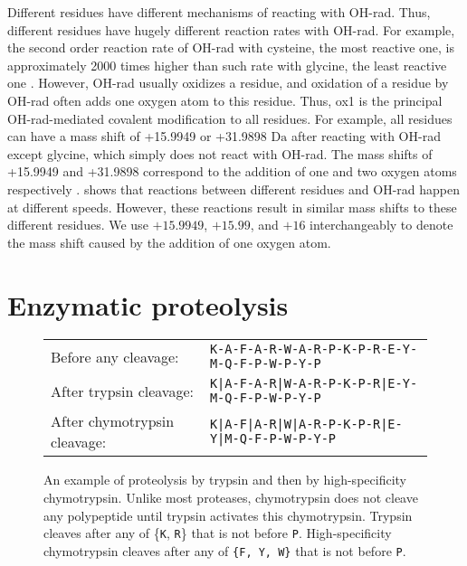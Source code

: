Different residues have different mechanisms of reacting with \gls{OH-rad}. 
Thus, different residues have hugely different reaction rates with \gls{OH-rad}.
For example,	the second order reaction rate of \gls{OH-rad} with cysteine, the most reactive one, 
 is approximately 2000 times higher than such rate with glycine, the least reactive one \cite{buxton1988critical}.	
However, \gls{OH-rad} usually oxidizes a residue, and oxidation of a residue by \gls{OH-rad} often adds one oxygen atom to this residue.
Thus, \gls{ox1} is the principal \gls{OH-rad}-mediated covalent modification to all residues.
For example, all residues can have a mass shift of +15.9949 or +31.9898 \ensuremath{\si{\dalton}} after reacting with \gls{OH-rad} except glycine, 
	which simply does not react with \gls{OH-rad}.
The mass shifts of +15.9949 and +31.9898 correspond to the addition of one and two oxygen atoms respectively \cite{xu2007hydroxyl}.
 shows that reactions between different residues and \gls{OH-rad} happen at different speeds. 
However, these reactions result in similar mass shifts to these different residues.
We use \( +15.9949\), \(+15.99\), and \(+16\) interchangeably to denote the mass shift caused by the addition of one oxygen atom.

\section{Enzymatic proteolysis} 
\label{sec:MS:proteolysis}

\begin{figure}
\center
\begin{tabular}{l l}
{Before any cleavage:}          & \texttt{K-A-F-A-R-W-A-R-P-K-P-R-E-Y-M-Q-F-P-W-P-Y-P}\\
{After trypsin cleavage:}       & \texttt{K|A-F-A-R|W-A-R-P-K-P-R|E-Y-M-Q-F-P-W-P-Y-P}\\
{After} {chymotrypsin cleavage:}& \texttt{K|A-F|A-R|W|A-R-P-K-P-R|E-Y|M-Q-F-P-W-P-Y-P}
\end{tabular}
\caption[An example of proteolysis]
{An example of proteolysis by trypsin and then by high-specificity chymotrypsin.
Unlike most proteases, chymotrypsin does not cleave any polypeptide until trypsin activates this chymotrypsin.
Trypsin cleaves after any of \{\texttt{K}, \texttt{R}\} that is not before \texttt{P}.
High-specificity chymotrypsin cleaves after any of \texttt{\{F, Y, W\}} that is not before \texttt{P}.
\label{fig:MS:proteolysisExample}}
\end{figure}

